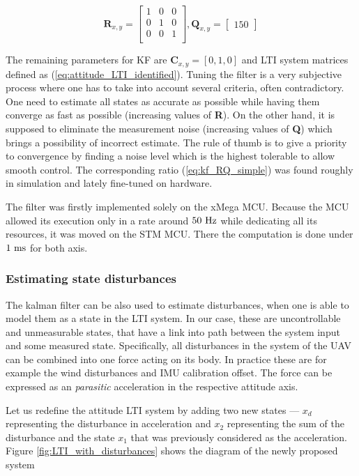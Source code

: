 \begin{equation}
\textbf{R}_{x,y} = \begin{bmatrix}
1 & 0 & 0 \\
0 & 1 & 0 \\
0 & 0 & 1 \\
\end{bmatrix}, 
\textbf{Q}_{x, y} = \begin{bmatrix}
150
\end{bmatrix}
\label{eq:kf_RQ_simple}
\end{equation}

The remaining parameters for KF are $\textbf{C}_{x, y} = \left[0, 1, 0\right]$ and LTI system matrices defined as (\ref{eq:attitude_LTI_identified}). Tuning the filter is a very subjective process where one has to take into account several criteria, often contradictory. One need to estimate all states as accurate as possible while having them converge as fast as possible (increasing values of \textbf{R}). On the other hand, it is supposed to eliminate the measurement noise (increasing values of \textbf{Q}) which brings a possibility of incorrect estimate. The rule of thumb is to give a priority to convergence by finding a noise level which is the highest tolerable to allow smooth control. The corresponding ratio (\ref{eq:kf_RQ_simple}) was found roughly in simulation and lately fine-tuned on hardware.

The filter was firstly implemented solely on the xMega MCU. Because the MCU allowed its execution only in a rate around $50~\mathrm{Hz}$ while dedicating all its resources, it was moved on the STM MCU. There the computation is done under $1~\mathrm{ms}$ for both axis.

\subsubsection{Estimating state disturbances}

The kalman filter can be also used to estimate disturbances, when one is able to model them as a state in the LTI system. In our case, these are uncontrollable and unmeasurable states, that have a link into path between the system input and some measured state. Specifically, all disturbances in the system of the UAV can be combined into one force acting on its body. In practice these are for example the wind disturbances and IMU calibration offset. The force can be expressed as an \textit{parasitic} acceleration in the respective attitude axis. 

Let us redefine the attitude LTI system by adding two new states --- $x_d$ representing the disturbance in acceleration and $x_2$ representing the sum of the disturbance and the state $x_1$ that was previously considered as the acceleration. Figure \ref{fig:LTI_with_disturbances} shows the diagram of the newly proposed system 

